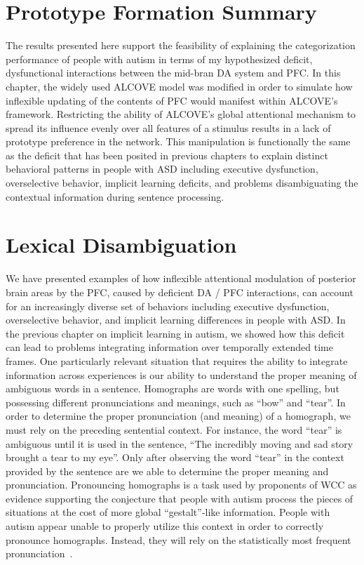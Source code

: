 \documentclass[man]{apa}
\begin{document}
\section{Prototype Formation Summary}

The results presented here support the feasibility of explaining the categorization performance of people with autism in terms of my hypothesized deficit, dysfunctional interactions between the mid-bran DA system and PFC.  In this chapter, the widely used ALCOVE model was modified in order to simulate how inflexible updating of the contents of PFC would manifest within ALCOVE's framework. Restricting the ability of ALCOVE's global attentional mechanism to spread its influence evenly over all features of a stimulus results in a lack of prototype preference in the network.  This manipulation is functionally the same as the deficit that has been posited in previous chapters to explain distinct behavioral patterns in people with ASD including executive dysfunction, overselective behavior, implicit learning deficits, and problems disambiguating the contextual information during sentence processing.      

\section{Lexical Disambiguation}

We have presented examples of how inflexible attentional modulation of posterior brain areas by the PFC, caused by deficient DA / PFC interactions, can account for an increasingly diverse set of behaviors including executive dysfunction, overselective behavior, and implicit learning differences in people with ASD.  In the previous chapter on implicit learning in autism, we showed how this deficit can lead to problems integrating information over temporally extended time frames.  One particularly relevant situation that requires the ability to integrate information across experiences is our ability to understand the proper meaning of ambiguous words in a sentence.  Homographs are words with one spelling, but possessing different pronunciations and meanings, such as ``bow'' and ``tear''.  In order to determine the proper pronunciation (and meaning) of a homograph, we must rely on the preceding sentential context.  For instance, the word ``tear'' is ambiguous until it is used in the sentence, ``The incredibly moving and sad story brought a tear to my eye''.  Only after observing the word ``tear'' in the context provided by the sentence are we able to determine the proper meaning and pronunciation.  Pronouncing homographs is a task used by proponents of WCC as evidence supporting the conjecture that people with autism process the pieces of situations at the cost of more global ``gestalt''-like information.  People with autism appear unable to properly utilize this context in order to correctly pronounce homographs.  Instead, they will rely on the statistically most frequent pronunciation~\cite{RefWorks:103,HappeF:1997:WCC_Homographs}.  
\end{document}
